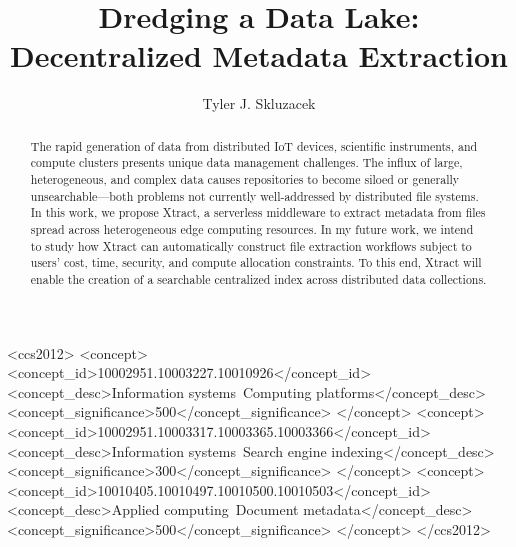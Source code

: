 \documentclass[sigconf, 9pt]{acmart}
\newcommand{\name}{Xtract}
\begin{document}
\title{Dredging a Data Lake: Decentralized Metadata Extraction}

\author{Tyler J. Skluzacek} 


\renewcommand{\shortauthors}{Skluzacek}

\begin{abstract}

The rapid generation of data from distributed IoT devices, scientific instruments, and compute clusters presents
unique data management challenges. The influx of large, heterogeneous, and complex data causes repositories to become 
siloed or generally unsearchable---both problems not currently well-addressed by distributed file systems.  
In this work, we propose \name{}, a serverless middleware 
to extract metadata from files spread across heterogeneous edge computing resources. 
In my future work, we intend to study how \name{} can
automatically construct file extraction workflows subject to 
users' cost, time, security, and compute allocation constraints. 
To this end, \name{} will enable the creation of a searchable centralized index across distributed data collections.


\end{abstract}

\begin{CCSXML}
<ccs2012>
<concept>
<concept_id>10002951.10003227.10010926</concept_id>
<concept_desc>Information systems~Computing platforms</concept_desc>
<concept_significance>500</concept_significance>
</concept>
<concept>
<concept_id>10002951.10003317.10003365.10003366</concept_id>
<concept_desc>Information systems~Search engine indexing</concept_desc>
<concept_significance>300</concept_significance>
</concept>
<concept>
<concept_id>10010405.10010497.10010500.10010503</concept_id>
<concept_desc>Applied computing~Document metadata</concept_desc>
<concept_significance>500</concept_significance>
</concept>
</ccs2012>
\end{CCSXML}



\maketitle
\end{document}
